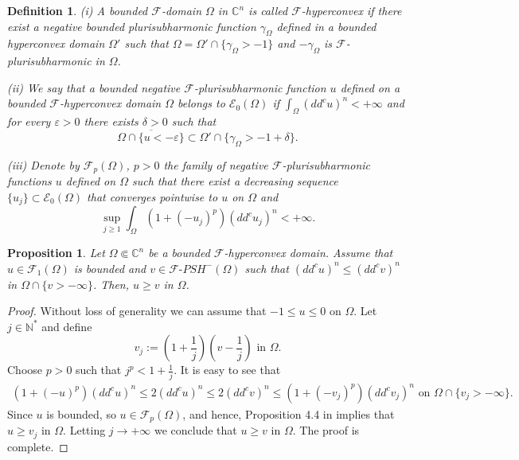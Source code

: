 \documentclass[3p,times]{elsarticle}
\numberwithin{equation}{section}
\newtheorem{proposition}[theorem]{Proposition}
\newtheorem{definition}[theorem]{Definition}
\newtheorem{The main theorem}[theorem]{The main theorem}
\theoremstyle{definition}
\begin{document}
\begin{definition}  
{\rm 
(i) A   bounded $\mathcal F$-domain $\Omega$ in $\mathbb C^n$    is  called  $\mathcal F$-hyperconvex if there exist a negative bounded plurisubharmonic function $\gamma_\Omega$ defined in a bounded hyperconvex domain $\Omega'$ such that $\Omega =\Omega' \cap \{\gamma_\Omega >-1\}$ and $-\gamma_\Omega $ is $\mathcal F$-plurisubharmonic  in $\Omega$.

(ii) We say that  a bounded negative  $\mathcal F$-plurisubharmonic function $u$ defined on a bounded $\mathcal F$-hyperconvex domain $\Omega$ belongs to $\mathcal E_0(\Omega)$ if  $\int_\Omega (dd^c u)^n<+\infty$ and   for every $\varepsilon>0$  there exists $\delta>0$ such that  
$$
\overline{\Omega\cap  \{u<- \varepsilon\} } \subset  \Omega' \cap\{\gamma_\Omega >-1+\delta\}.
$$ 

(iii) Denote by  $\mathcal F_p (\Omega)$, $p>0$   the family of negative $\mathcal F$-plurisubharmonic functions $u$ defined on $\Omega$ such that there exist a decreasing sequence $\{u_j\} \subset \mathcal E_0(\Omega)$ that converges pointwise to $u$ on $\Omega$ and 
$$\sup_{j\geq 1} \int_\Omega (1+(-u_j)^p)  (dd^c u_j)^n<+\infty.$$
} \end{definition}


\begin{proposition} \label{lem0}
Let $\Omega \Subset \mathbb C^n$ be a bounded $\mathcal F$-hyperconvex domain. Assume that  $u\in \mathcal F_1  (\Omega)$ is bounded  and $v\in \mathcal F\text{-}PSH^-(\Omega)$ such that   $ (dd^c u)^n \leq  (dd^c v)^n$ in $\Omega \cap   \{v>-\infty\}$.  
Then, $u \geq v$ in $\Omega$. 
\end{proposition}

\begin{proof}
Without loss of generality  we can assume that $-1\leq u \leq 0$ on $\Omega$. Let $j \in \mathbb N^*$ and define 
$$
v_j:= (1+\frac{1}{j}) (v-\frac{1}{j}) \text{ in } \Omega.
$$
Choose $p>0$ such that 
$ j^p <  1+\frac{1}{j} $.
It is easy to see that 
\begin{align*}
(1+ (-u)^p) (dd^c u)^n 
\leq 2 (dd^c u)^n  
\leq 2 (dd^c v)^n 
\leq (1+ (-v_j)^p) (dd^c v_j)^n 
\text{ on } \Omega \cap   \{v_j>-\infty\}.
\end{align*}
Since $u$ is bounded, so $u\in \mathcal F_p (\Omega)$, and hence,  Proposition 4.4 in \cite{TVH} implies that 
$u \geq v_j$ in $\Omega$. 
Letting $j\to+\infty$ we conclude  that $u \geq v$ in $\Omega$. The proof is complete. 
\end{proof}
\end{document}
